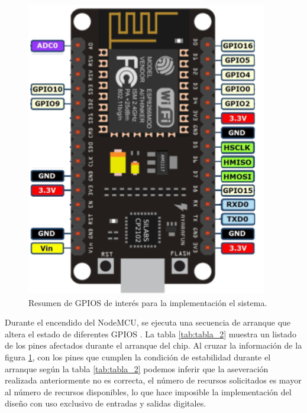 \begin{figure}[ht]
	\centering
	\includegraphics[scale=.55]{./Figures/Capitulo4/Figura_E.png}
	\caption{Resumen de GPIOS de interés para la implementación el sistema.}
	\label{fig:figura_e}
\end{figure}

Durante el encendido del NodeMCU, se ejecuta una secuencia de arranque que altera el estado de diferentes GPIOS \cite{node_gpio}. La tabla \ref{tab:tabla_2} muestra un listado de los pines afectados durante el arranque del chip. Al cruzar la información de la figura \ref{fig:figura_e}, con los pines que cumplen la condición de estabilidad durante el arranque según la tabla \ref{tab:tabla_2} podemos inferir que la aseveración realizada anteriormente no es correcta, el número de recursos solicitados es mayor al número de recursos disponibles, lo que hace imposible la implementación del diseño con uso exclusivo de entradas y salidas digitales.

